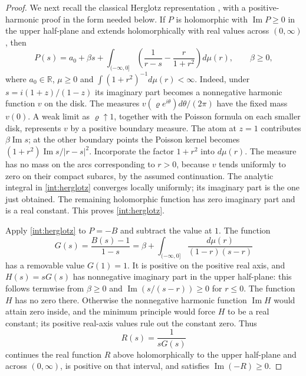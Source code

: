 \documentclass[11pt]{article}
\newcommand{\R}{\mathbb R}
\theoremstyle{remark}\newtheorem{remark}[theorem]{Remark}
\begin{document}
\begin{proof}
We next recall the classical Herglotz representation
\cite{Herglotz1911}, with a positive-harmonic proof in the form needed
below.  If $P$ is holomorphic with $\operatorname{Im}P\ge0$ in
the upper half-plane and extends holomorphically with real values
across $(0,\infty)$, then
\begin{equation}\label{int:herglotz}
 P(s)=a_0+\beta s+\int_{(-\infty,0]}
 \left(\frac1{r-s}-\frac{r}{1+r^2}\right)d\mu(r),
 \qquad \beta\ge0,
\end{equation}
where $a_0\in\R$, $\mu\ge0$ and
$\int(1+r^2)^{-1}d\mu(r)<\infty$.
Indeed, under $s=i(1+z)/(1-z)$ its imaginary part becomes a
nonnegative harmonic function $v$ on the disk.  The measures
$v(\varrho e^{i\theta})d\theta/(2\pi)$ have the fixed mass $v(0)$.
A weak limit as $\varrho\uparrow1$, together with the Poisson formula
on each smaller disk, represents $v$ by a positive boundary measure.
The atom at $z=1$ contributes $\beta\operatorname{Im}s$; at the
other boundary points the Poisson kernel becomes
$(1+r^2)\operatorname{Im}s/|r-s|^2$.  Incorporate the factor
$1+r^2$ into $d\mu(r)$.  The measure has no mass on the arcs
corresponding to $r>0$, because $v$ tends uniformly to zero on their
compact subarcs, by the assumed continuation.  The analytic
integral in \eqref{int:herglotz} converges locally uniformly; its
imaginary part is the one just obtained.  The remaining holomorphic
function has zero imaginary part and is a real constant.  This
proves \eqref{int:herglotz}.

Apply \eqref{int:herglotz} to $P=-B$ and subtract the value at $1$.
The function
\begin{equation}\label{int:G}
 G(s)=\frac{B(s)-1}{1-s}
 =\beta+\int_{(-\infty,0]}\frac{d\mu(r)}{(1-r)(s-r)}
\end{equation}
has a removable value $G(1)=1$.  It is positive on the positive real
axis, and $H(s)=sG(s)$ has nonnegative imaginary part in the upper
half-plane: this follows termwise from $\beta\ge0$ and
$\operatorname{Im}(s/(s-r))\ge0$ for $r\le0$.
The function $H$ has no zero there.  Otherwise the nonnegative
harmonic function $\operatorname{Im}H$ would attain zero inside,
and the minimum principle would force $H$ to be a real constant;
its positive real-axis values rule out the constant zero.
Thus
\[
 R(s)=\frac1{sG(s)}
\]
continues the real function $R$ above holomorphically to the upper
half-plane and across $(0,\infty)$,
is positive on that interval, and satisfies
$\operatorname{Im}(-R)\ge0$.


\end{proof}
\end{document}

